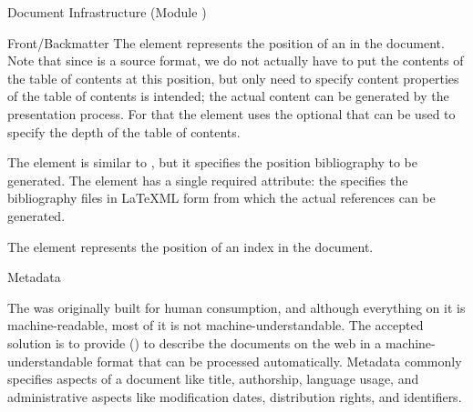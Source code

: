 \begin{tchapter}[id=omdoc-infrastructure,short=Document Infrastructure]{Document Infrastructure (Module )}
{\begin{newpart}
\begin{tsection}[id=frontbackmatter]{Front/Backmatter}
  The  element represents the position of an  in the document. Note that
  since \omdoc is a source format, we do not actually have to put the contents of the
  table of contents at this position, but only need to specify content properties of the
  table of contents is intended; the actual content can be generated by the presentation
  process. For that the  element uses the optional
   that can be used to specify the depth of the table
  of contents.

 The  element is similar to , but it specifies the
  position bibliography to be generated. The  element has a single
  required attribute: the  specifies the bibliography
  files in LaTeXML form
  from which the actual references can be generated.

  The  element represents the position of an index in the
  document.
\end{tsection}
\end{newpart}

\begin{tsection}[id=metadata]{Metadata}
  
  The  was originally built for human consumption, and although everything
  on it is machine-readable, most of it is not machine-understandable.  The accepted
  solution is to provide  () to describe
  the documents on the web in a machine-understandable format that can be processed
  automatically. Metadata commonly specifies aspects of a document like title, authorship,
  language usage, and administrative aspects like modification dates, distribution rights,
  and identifiers.
  

\end{tsection}}
\end{tchapter}

